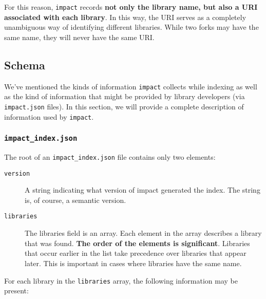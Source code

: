 \documentclass[11pt,a4paper,twocolumn]{article}
\newcommand{\code}[1]{\texttt{#1}} %
\begin{document}
For this reason, \code{impact} records {\bf not only the library name,
  but also a URI associated with each library}.  In this way, the URI
serves as a completely unambiguous way of identifying different
libraries.  While two forks may have the same name, they will never
have the same URI.

\subsection{Schema}

We've mentioned the kinds of information \code{impact} collects while
indexing as well as the kind of information that might be provided by
library developers (via \code{impact.json} files).  In this section,
we will provide a complete description of information used by
\code{impact}.

\subsubsection{\code{impact\_index.json}}
\label{sec:index_schema}

The root of an \code{impact\_index.json} file contains only two
elements:

\begin{description}
  \item[\code{version}] A string indicating what version of impact
    generated the index.  The string is, of course, a semantic
    version.
  \item[\code{libraries}] The libraries field is an array.  Each
    element in the array describes a library that was found.  {\bf The
      order of the elements is significant}.  Libraries that occur
    earlier in the list take precedence over libraries that appear
    later.  This is important in cases where libraries have the same
    name.
\end{description}

For each library in the \code{libraries} array, the following
information may be present:
\end{document}
